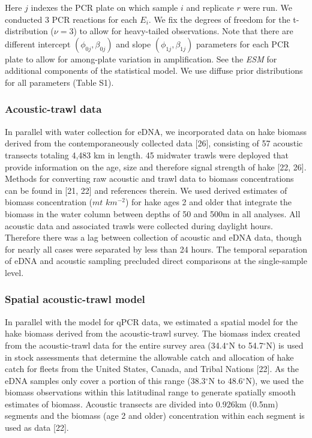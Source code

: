\documentclass[
]{article}
\begin{document}
Here \(j\) indexes the PCR plate on which sample \(i\) and replicate
\(r\) were run. We conducted 3 PCR reactions for each \(E_i\). We fix
the degrees of freedom for the t-distribution (\(\nu = 3\)) to allow for
heavy-tailed observations. Note that there are different intercept
\((\phi_{0j},\beta_{0j})\) and slope \((\phi_{1j},\beta_{1j})\)
parameters for each PCR plate to allow for among-plate variation in
amplification. See the \emph{ESM} for additional components of the statistical model. 
We use diffuse prior distributions for all parameters (Table S1).

\hypertarget{acoustic-trawl-data}{%
\subsubsection{Acoustic-trawl data}\label{acoustic-trawl-data}}

In parallel with water collection for eDNA, we incorporated data on hake
biomass derived from the contemporaneously collected data
{[}26{]}, consisting of 57 acoustic transects totaling 4,483 km in length. 45
midwater trawls were deployed that provide information on the age, size
and therefore signal strength of hake  {[}22, 26{]}. Methods for converting
raw acoustic and trawl data to biomass concentrations can be found in
{[}21, 22{]} and references therein. We used derived estimates of biomass
concentration (\(mt\) \(km^{-2}\)) for hake ages 2 and older that
integrate the biomass in the water column between depths of 50 and 500m
in all analyses. All acoustic data and associated trawls were collected
during daylight hours. Therefore there was a lag between collection of
acoustic and eDNA data, though for nearly all cases were
separated by less than 24 hours. The temporal separation of eDNA and
acoustic sampling precluded direct comparisons at the single-sample
level.

\hypertarget{spatial-acoustic-trawl-model}{%
\subsubsection{Spatial acoustic-trawl
model}\label{spatial-acoustic-trawl-model}}

In parallel with the model for qPCR data, we estimated a spatial model
for the hake biomass derived from the acoustic-trawl survey. The biomass
index created from the acoustic-trawl data for the entire survey area
(34.4\(^{\circ}\)N to 54.7\(^{\circ}\)N) is used in stock assessments
that determine the allowable catch and allocation of hake catch for
fleets from the United States, Canada, and Tribal Nations {[}22{]}. As the
eDNA samples only cover a portion of this range (38.3\(^{\circ}\)N to
48.6\(^{\circ}\)N), we used the biomass observations within this
latitudinal range to generate spatially smooth estimates of biomass.
Acoustic transects are divided into 0.926km (0.5nm) segments and the
biomass (age 2 and older) concentration within each segment is used as
data {[}22{]}.
\end{document}
